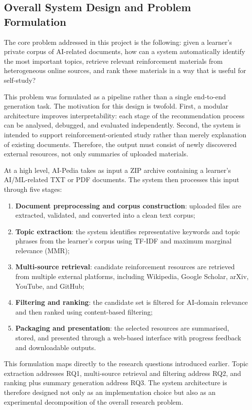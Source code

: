\documentclass[10pt,journal,compsoc]{IEEEtran}
\begin{document}
\subsection{Overall System Design and Problem Formulation}

The core problem addressed in this project is the following: given a learner's private corpus of AI-related documents, how can a system automatically identify the most important topics, retrieve relevant reinforcement materials from heterogeneous online sources, and rank these materials in a way that is useful for self-study?

This problem was formulated as a pipeline rather than a single end-to-end generation task. The motivation for this design is twofold. First, a modular architecture improves interpretability: each stage of the recommendation process can be analysed, debugged, and evaluated independently. Second, the system is intended to support reinforcement-oriented study rather than merely explanation of existing documents. Therefore, the output must consist of newly discovered external resources, not only summaries of uploaded materials.

At a high level, AI-Pedia takes as input a ZIP archive containing a learner's AI/ML-related TXT or PDF documents. The system then processes this input through five stages:

\begin{enumerate}
\item \textbf{Document preprocessing and corpus construction}: uploaded files are extracted, validated, and converted into a clean text corpus;
\item \textbf{Topic extraction}: the system identifies representative keywords and topic phrases from the learner's corpus using TF-IDF and maximum marginal relevance (MMR);
\item \textbf{Multi-source retrieval}: candidate reinforcement resources are retrieved from multiple external platforms, including Wikipedia, Google Scholar, arXiv, YouTube, and GitHub;
\item \textbf{Filtering and ranking}: the candidate set is filtered for AI-domain relevance and then ranked using content-based filtering;
\item \textbf{Packaging and presentation}: the selected resources are summarised, stored, and presented through a web-based interface with progress feedback and downloadable outputs.
\end{enumerate}

This formulation maps directly to the research questions introduced earlier. Topic extraction addresses RQ1, multi-source retrieval and filtering address RQ2, and ranking plus summary generation address RQ3. The system architecture is therefore designed not only as an implementation choice but also as an experimental decomposition of the overall research problem.
\end{document}
